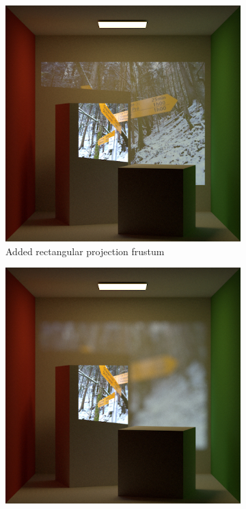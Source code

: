 \begin{figure}[]
\begin{subfigure}[b]{0.32\textwidth}
        \includegraphics[width=\textwidth]{images/03-projector_features-frustum.jpg}
        \caption{Added rectangular projection frustum}
        \label{fig:methods_projector_features_frustum}
    \end{subfigure}
    \hfill
    \begin{subfigure}[b]{0.32\textwidth}
        \centering
        \includegraphics[width=\textwidth]{images/03-projector_features-thin_lens.jpg}

\end{subfigure}
\end{figure}
